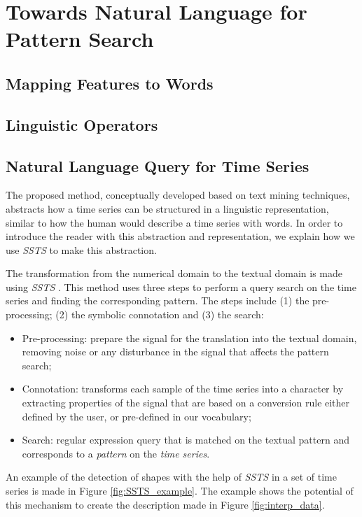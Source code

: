 \section{Towards Natural Language for Pattern Search}

\subsection{Mapping Features to Words}

\subsection{Linguistic Operators}

\subsection{Natural Language Query for Time Series}

The proposed method, conceptually developed based on text mining techniques, abstracts how a time series can be structured in a linguistic representation, similar to how the human would describe a time series with words. In order to introduce the reader with this abstraction and representation, we explain how we use \textit{SSTS} to make this abstraction.
\par
The transformation from the numerical domain to the textual domain is made using \textit{SSTS} \cite{ssts}. This method uses three steps to perform a query search on the time series and finding the corresponding pattern. The steps include (1) the pre-processing; (2) the symbolic connotation and (3) the search:

\begin{itemize}
    \item Pre-processing: prepare the signal for the translation into the textual domain, removing noise or any disturbance in the signal that affects the pattern search;
    \item Connotation: transforms each sample of the time series into a character by extracting properties of the signal that are based on a conversion rule either defined by the user, or pre-defined in our vocabulary; 
    \item Search: regular expression query that is matched on the textual pattern and corresponds to a \textit{pattern} on the \textit{time series}.
\end{itemize}

An example of the detection of shapes with the help of \textit{SSTS} in a set of time series is made in Figure \ref{fig:SSTS_example}. The example shows the potential of this mechanism to create the description made in Figure \ref{fig:interp_data}. 

